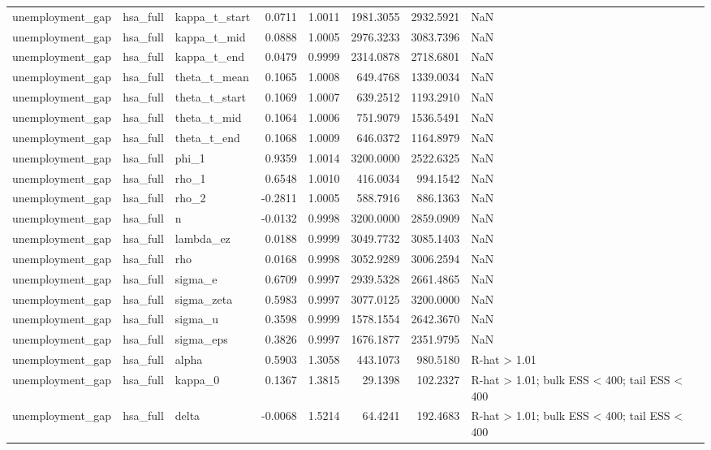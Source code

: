 \begin{tabular}{lllrrrrl}
unemployment\_gap & hsa\_full & kappa\_t\_start & 0.0711 & 1.0011 & 1981.3055 & 2932.5921 & NaN \\
unemployment\_gap & hsa\_full & kappa\_t\_mid & 0.0888 & 1.0005 & 2976.3233 & 3083.7396 & NaN \\
unemployment\_gap & hsa\_full & kappa\_t\_end & 0.0479 & 0.9999 & 2314.0878 & 2718.6801 & NaN \\
unemployment\_gap & hsa\_full & theta\_t\_mean & 0.1065 & 1.0008 & 649.4768 & 1339.0034 & NaN \\
unemployment\_gap & hsa\_full & theta\_t\_start & 0.1069 & 1.0007 & 639.2512 & 1193.2910 & NaN \\
unemployment\_gap & hsa\_full & theta\_t\_mid & 0.1064 & 1.0006 & 751.9079 & 1536.5491 & NaN \\
unemployment\_gap & hsa\_full & theta\_t\_end & 0.1068 & 1.0009 & 646.0372 & 1164.8979 & NaN \\
unemployment\_gap & hsa\_full & phi\_1 & 0.9359 & 1.0014 & 3200.0000 & 2522.6325 & NaN \\
unemployment\_gap & hsa\_full & rho\_1 & 0.6548 & 1.0010 & 416.0034 & 994.1542 & NaN \\
unemployment\_gap & hsa\_full & rho\_2 & -0.2811 & 1.0005 & 588.7916 & 886.1363 & NaN \\
unemployment\_gap & hsa\_full & n & -0.0132 & 0.9998 & 3200.0000 & 2859.0909 & NaN \\
unemployment\_gap & hsa\_full & lambda\_ez & 0.0188 & 0.9999 & 3049.7732 & 3085.1403 & NaN \\
unemployment\_gap & hsa\_full & rho & 0.0168 & 0.9998 & 3052.9289 & 3006.2594 & NaN \\
unemployment\_gap & hsa\_full & sigma\_e & 0.6709 & 0.9997 & 2939.5328 & 2661.4865 & NaN \\
unemployment\_gap & hsa\_full & sigma\_zeta & 0.5983 & 0.9997 & 3077.0125 & 3200.0000 & NaN \\
unemployment\_gap & hsa\_full & sigma\_u & 0.3598 & 0.9999 & 1578.1554 & 2642.3670 & NaN \\
unemployment\_gap & hsa\_full & sigma\_eps & 0.3826 & 0.9997 & 1676.1877 & 2351.9795 & NaN \\
unemployment\_gap & hsa\_full & alpha & 0.5903 & 1.3058 & 443.1073 & 980.5180 & R-hat > 1.01 \\
unemployment\_gap & hsa\_full & kappa\_0 & 0.1367 & 1.3815 & 29.1398 & 102.2327 & R-hat > 1.01; bulk ESS < 400; tail ESS < 400 \\
unemployment\_gap & hsa\_full & delta & -0.0068 & 1.5214 & 64.4241 & 192.4683 & R-hat > 1.01; bulk ESS < 400; tail ESS < 400 \\

\end{tabular}
